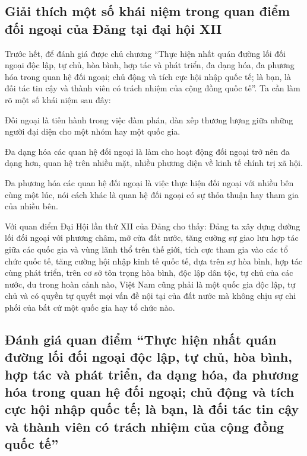 \documentclass[12pt]{article}
\begin{document}
\subsection{Giải thích một số khái niệm trong quan điểm đối ngoại của Đảng tại đại hội XII}
Trước hết, để đánh giá được chủ chương ``Thực hiện nhất quán đường lối đối
ngoại độc lập, tự chủ, hòa bình, hợp tác và phát triển, đa
dạng hóa, đa phương hóa trong quan hệ đối ngoại; chủ động và
tích cực hội nhập quốc tế; là bạn, là đối tác tin cậy và thành viên
có trách nhiệm của cộng đồng quốc tế''. Ta cần làm rõ một số
khái niệm sau đây:

Đối ngoại là tiến hành trong việc đàm phán, dàn xếp thương lượng giữa
những người đại diện cho một nhóm hay một quốc gia.

Đa dạng hóa các quan hệ đối ngoại là làm cho hoạt động
đối ngoại trở nên đa dạng hơn, quan hệ trên nhiều mặt, nhiều phương
diện về kinh tế chính trị xã hội.

Đa phương hóa các quan hệ đối ngoại là việc thực hiện đối ngoại với
nhiều bên cùng một lúc, nói cách khác là quan hệ đối ngoại có sự
thỏa thuận hay tham gia của nhiều bên.

Với quan điểm Đại Hội lần thứ XII của Đảng cho thấy: Đảng ta
xây dựng đường lối đối ngoại với phương châm, mở cửa đất nước, tăng
cường sự giao lưu hợp tác giữa các quốc gia và vùng lãnh thổ trên thế giới, tích
cực tham gia vào các tổ chức quốc tế, tăng cường hội nhập kinh tế quốc tế,
dựa trên sự hòa bình, hợp tác cùng phát triển, trên cơ sở tôn trọng hòa bình,
độc lập dân tộc, tự chủ của các nước, du trong hoàn cảnh nào, Việt
Nam cũng phải là một quốc gia độc lập, tự chủ và có quyền tự
quyết mọi vấn đề nội tại của đất nước mà không chịu sự chi phối của
bất cứ một quốc gia hay tổ chức nào.
\subsection{Đánh giá quan điểm ``Thực hiện nhất quán đường lối đối ngoại độc lập, tự chủ,
    hòa bình, hợp tác và phát triển, đa dạng hóa, đa phương hóa trong quan hệ đối
    ngoại; chủ động và tích cực hội nhập quốc tế; là bạn, là đối tác tin cậy và
    thành viên có trách nhiệm của cộng đồng quốc tế''}
\end{document}
